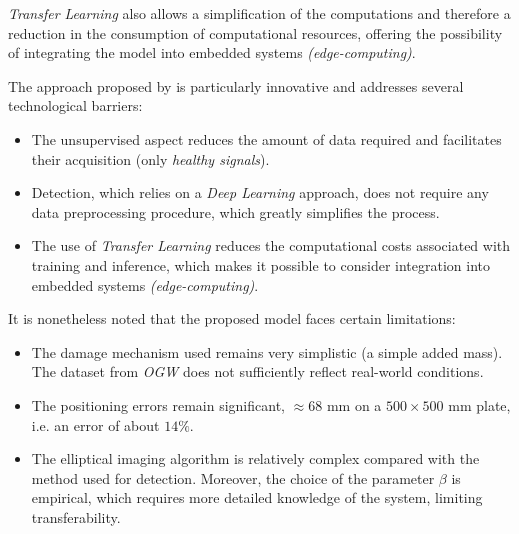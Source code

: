 \documentclass[12pt]{article}
\begin{document}
\textit{Transfer Learning} also allows a simplification of the computations and therefore a reduction in the consumption of computational resources, offering the possibility of integrating the model into embedded systems \textit{(edge-computing)}.
 
The approach proposed by \cite{SAWANT2023106931} is particularly innovative and addresses several technological barriers: 
 
\begin{itemize}[itemsep=8pt]
    
    \item The unsupervised aspect reduces the amount of data required and facilitates their acquisition (only \textit{healthy signals}).
    
    \item Detection, which relies on a \textit{Deep Learning} approach, does not require any data preprocessing procedure, which greatly simplifies the process.
    
    \item The use of \textit{Transfer Learning} reduces the computational costs associated with training and inference, which makes it possible to consider integration into embedded systems \textit{(edge-computing)}.
    
\end{itemize}
 
It is nonetheless noted that the proposed model faces certain limitations:
 
\begin{itemize}[itemsep=8pt]
 
    \item The damage mechanism used remains very simplistic (a simple added mass). The dataset from \textit{OGW} does not sufficiently reflect real-world conditions.
    
    \item The positioning errors remain significant, $\approx 68$ mm on a $500 \times 500$ mm plate, i.e. an error of about $14\%$.
    
    \item The elliptical imaging algorithm is relatively complex compared with the method used for detection. Moreover, the choice of the parameter $\beta$ is empirical, which requires more detailed knowledge of the system, limiting transferability.  
    
\end{itemize}
 
\end{document}
